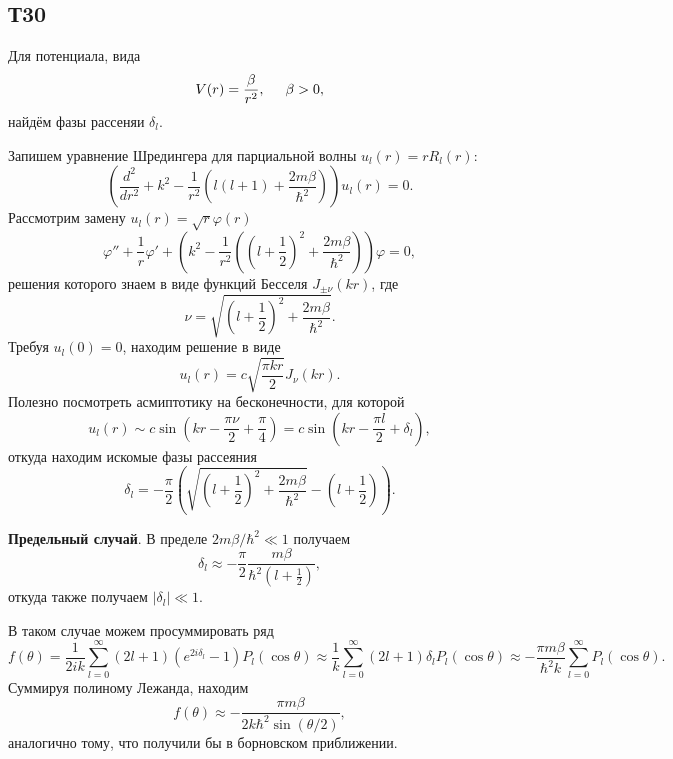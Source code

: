 \subsection*{Т30}


Для потенциала, вида
\begin{equation*}
	V(r) = \frac{\beta}{r^2},
	\hspace{5 mm} 
	\beta > 0,
\end{equation*}
найдём фазы рассеняи $\delta_l$. 

Запишем уравнение Шредингера для парциальной волны $u_l (r) = r R_l (r)$:
\begin{equation*}
	\left(
		\frac{d^2 }{d r^2} + k^2 - \frac{1}{r^2}\left(
			l(l+1) + \frac{2 m \beta}{\hbar^2}
		\right)
	\right) u_l (r) = 0.
\end{equation*}
Рассмотрим замену $u_l (r) = \sqrt{r} \varphi(r)$
\begin{equation*}
	\varphi'' + \frac{1}{r} \varphi' + \left(
		k^2 - \frac{1}{r^2}\left(
			\left(l +\frac{1}{2}\right)^2 + \frac{2 m \beta}{\hbar^2}
		\right)
	\right)\varphi = 0,
\end{equation*}
решения которого знаем в виде функций Бесселя $J_{\pm \nu} (kr)$, где
\begin{equation*}
	\nu = \sqrt{\left(l + \frac{1}{2}\right)^2 + \frac{2 m \beta}{\hbar^2}}.
\end{equation*}
Требуя $u_l (0) = 0$, находим решение в виде
\begin{equation*}
	u_l (r) = c \sqrt{\frac{\pi k r}{2}} J_\nu (kr).
\end{equation*}
Полезно посмотреть асмиптотику на бесконечности, для которой
\begin{equation*}
	u_l(r) \sim c \sin\left(kr - \frac{\pi \nu}{2} + \frac{\pi}{4}\right) = c \sin\left(kr - \frac{\pi l}{2} + \delta_l\right),
\end{equation*}
откуда находим искомые фазы рассеяния
\begin{equation*}
	\delta_l = - \frac{\pi}{2} \left(
		\sqrt{\left(l + \frac{1}{2}\right)^2 + \frac{2 m \beta}{\hbar^2}} - \left(l + \frac{1}{2}\right)
	\right).
\end{equation*}

\textbf{Предельный случай}. В пределе $2 m \beta / \hbar^2 \ll 1$ получаем
\begin{equation*}
	\delta_l \approx - \frac{\pi}{2} \frac{m \beta}{\hbar^2(l + \tfrac{1}{2})},
\end{equation*}
откуда также получаем $|\delta_l| \ll 1$. 

В таком случае можем просуммировать ряд
\begin{equation*}
	f(\theta) = \frac{1}{2 ik} \sum_{l=0}^{\infty} (2l+1) \left(e^{2 i \delta_l}- 1\right) P_l  (\cos \theta) \approx \frac{1}{k} \sum_{l=0}^{\infty} (2l+1) \delta_l P_l(\cos \theta) \approx	
	-\frac{\pi m \beta}{\hbar^2 k} \sum_{l=0}^{\infty} P_l(\cos \theta).
\end{equation*}
Суммируя полиному Лежанда, находим
\begin{equation*}
	f(\theta) \approx	 - \frac{\pi m \beta}{2 k \hbar^2 \sin(\theta/2)},
\end{equation*}
аналогично тому, что получили бы в борновском приближении.



